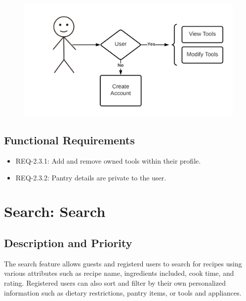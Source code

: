 \documentclass{scrreprt}
\begin{document}
\begin{figure}[H]\centering
    \includegraphics[width=\columnwidth]{FlowCharts/Profile-Tools.png}
\end{figure}

\subsection{\gls{Functional Requirements}}

\begin{itemize}
    \item REQ-2.3.1: Add and remove owned tools within their profile.
    \item REQ-2.3.2: Pantry details are private to the user.
\end{itemize}

\section{Search: Search}

\subsection{Description and Priority}

The search feature allows guests and registerd users to search for recipes using various attributes such as recipe name, ingredients included, cook time, and rating. Registered users can also sort and filter by their own personalized information such as dietary restrictions, pantry items, or tools and appliances.
\end{document}
